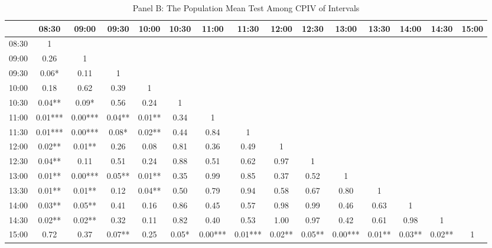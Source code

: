 \begin{table}[h]
\begin{threeparttable}
\medskip

\begin{subtable}[t]{\linewidth}

\caption{Panel B: The Population Mean Test Among CPIV of Intervals}
\tiny

\begin{tabular}{|c|cccccccccccccc}
\toprule

      & 08:30   & 09:00   & 09:30  & 10:00  & 10:30 & 11:00   & 11:30   & 12:00  & 12:30  & 13:00   & 13:30  & 14:00  & 14:30  & 15:00 \\ \midrule
08:30 & 1       &         &        &        &       &         &         &        &        &         &        &        &        &       \\
09:00 & 0.26    & 1       &        &        &       &         &         &        &        &         &        &        &        &       \\
09:30 & 0.06*   & 0.11    & 1      &        &       &         &         &        &        &         &        &        &        &       \\
10:00 & 0.18    & 0.62    & 0.39   & 1      &       &         &         &        &        &         &        &        &        &       \\
10:30 & 0.04**  & 0.09*   & 0.56   & 0.24   & 1     &         &         &        &        &         &        &        &        &       \\
11:00 & 0.01*** & 0.00*** & 0.04** & 0.01** & 0.34  & 1       &         &        &        &         &        &        &        &       \\
11:30 & 0.01*** & 0.00*** & 0.08*  & 0.02** & 0.44  & 0.84    & 1       &        &        &         &        &        &        &       \\
12:00 & 0.02**  & 0.01**  & 0.26   & 0.08   & 0.81  & 0.36    & 0.49    & 1      &        &         &        &        &        &       \\
12:30 & 0.04**  & 0.11    & 0.51   & 0.24   & 0.88  & 0.51    & 0.62    & 0.97   & 1      &         &        &        &        &       \\
13:00 & 0.01**  & 0.00*** & 0.05** & 0.01** & 0.35  & 0.99    & 0.85    & 0.37   & 0.52   & 1       &        &        &        &       \\
13:30 & 0.01**  & 0.01**  & 0.12   & 0.04** & 0.50  & 0.79    & 0.94    & 0.58   & 0.67   & 0.80    & 1      &        &        &       \\
14:00 & 0.03**  & 0.05**  & 0.41   & 0.16   & 0.86  & 0.45    & 0.57    & 0.98   & 0.99   & 0.46    & 0.63   & 1      &        &       \\
14:30 & 0.02**  & 0.02**  & 0.32   & 0.11   & 0.82  & 0.40    & 0.53    & 1.00   & 0.97   & 0.42    & 0.61   & 0.98   & 1      &       \\
15:00 & 0.72    & 0.37    & 0.07** & 0.25   & 0.05* & 0.00*** & 0.01*** & 0.02** & 0.05** & 0.00*** & 0.01** & 0.03** & 0.02** & 1  \\
\bottomrule


\end{tabular}
\end{subtable}
\end{threeparttable}
\end{table}
